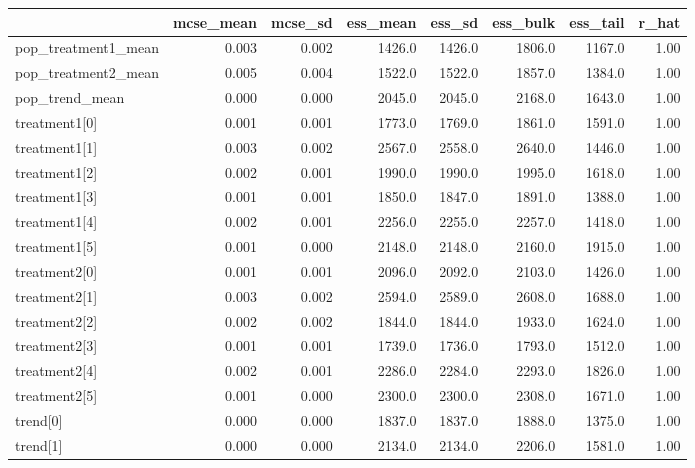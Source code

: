 \begin{tabular}{lrrrrrrr}
\toprule
{} &  mcse\_mean &  mcse\_sd &  ess\_mean &  ess\_sd &  ess\_bulk &  ess\_tail &  r\_hat \\
\midrule
pop\_treatment1\_mean   &      0.003 &    0.002 &    1426.0 &  1426.0 &    1806.0 &    1167.0 &   1.00 \\
pop\_treatment2\_mean   &      0.005 &    0.004 &    1522.0 &  1522.0 &    1857.0 &    1384.0 &   1.00 \\
pop\_trend\_mean        &      0.000 &    0.000 &    2045.0 &  2045.0 &    2168.0 &    1643.0 &   1.00 \\
treatment1[0]         &      0.001 &    0.001 &    1773.0 &  1769.0 &    1861.0 &    1591.0 &   1.00 \\
treatment1[1]         &      0.003 &    0.002 &    2567.0 &  2558.0 &    2640.0 &    1446.0 &   1.00 \\
treatment1[2]         &      0.002 &    0.001 &    1990.0 &  1990.0 &    1995.0 &    1618.0 &   1.00 \\
treatment1[3]         &      0.001 &    0.001 &    1850.0 &  1847.0 &    1891.0 &    1388.0 &   1.00 \\
treatment1[4]         &      0.002 &    0.001 &    2256.0 &  2255.0 &    2257.0 &    1418.0 &   1.00 \\
treatment1[5]         &      0.001 &    0.000 &    2148.0 &  2148.0 &    2160.0 &    1915.0 &   1.00 \\
treatment2[0]         &      0.001 &    0.001 &    2096.0 &  2092.0 &    2103.0 &    1426.0 &   1.00 \\
treatment2[1]         &      0.003 &    0.002 &    2594.0 &  2589.0 &    2608.0 &    1688.0 &   1.00 \\
treatment2[2]         &      0.002 &    0.002 &    1844.0 &  1844.0 &    1933.0 &    1624.0 &   1.00 \\
treatment2[3]         &      0.001 &    0.001 &    1739.0 &  1736.0 &    1793.0 &    1512.0 &   1.00 \\
treatment2[4]         &      0.002 &    0.001 &    2286.0 &  2284.0 &    2293.0 &    1826.0 &   1.00 \\
treatment2[5]         &      0.001 &    0.000 &    2300.0 &  2300.0 &    2308.0 &    1671.0 &   1.00 \\
trend[0]              &      0.000 &    0.000 &    1837.0 &  1837.0 &    1888.0 &    1375.0 &   1.00 \\
trend[1]              &      0.000 &    0.000 &    2134.0 &  2134.0 &    2206.0 &    1581.0 &   1.00 \\

\end{tabular}
